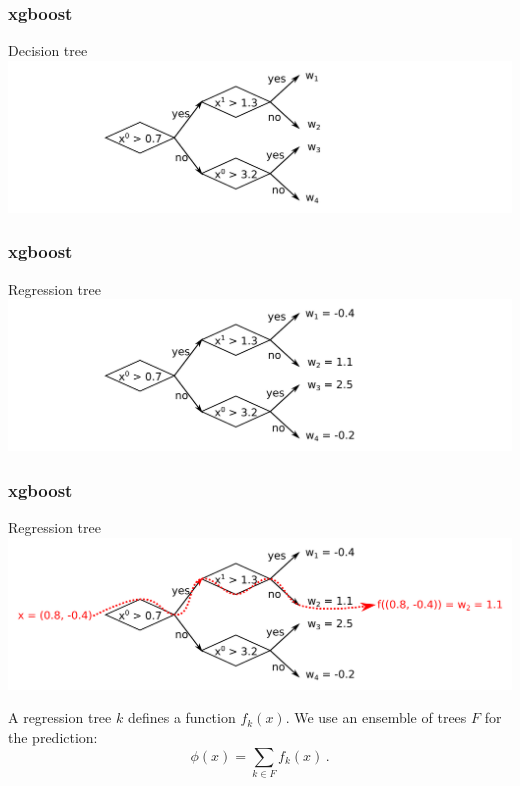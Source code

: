 \documentclass[mathserif, 10pt]{beamer}
\begin{document}
\begin{frame}
    \frametitle{xgboost}

    Decision tree
    \includegraphics[width=\textwidth]{figures/dectree.png}

\end{frame}

\begin{frame}
    \frametitle{xgboost}

    Regression tree
    \includegraphics[width=\textwidth]{figures/regtree_nof.png}

\end{frame}

\begin{frame}
    \frametitle{xgboost}

    Regression tree
    \includegraphics[width=\textwidth]{figures/regtree.png}

    A regression tree $k$ defines a function $f_k(x)$. We use an ensemble of trees $F$ for the prediction: $$\phi(x) = \sum_{k\in F} f_k(x)\,.$$
\end{frame}
\end{document}

